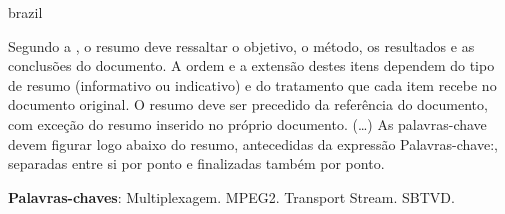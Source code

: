 \documentclass[
	12pt,				%
	openright,			%
	twoside,			%
	a4paper,			%
	brazil,
	french,				%
	english
	]{abntex2}
\begin{document}
%




\setlength{\absparsep}{18pt} %
\begin{resumo}[Resumo]
 \begin{otherlanguage*}{brazil}
 
Segundo a , o resumo deve ressaltar o objetivo, o método, os resultados e as conclusões do documento. A ordem e a extensão destes itens dependem do tipo de resumo (informativo ou indicativo) e do tratamento que cada item recebe no documento original. O resumo deve ser precedido da referência do documento, com exceção do resumo inserido no
 próprio documento. (\ldots) As palavras-chave devem figurar logo abaixo do resumo, antecedidas da expressão Palavras-chave:, separadas entre si por ponto e finalizadas também por ponto.

 \textbf{Palavras-chaves}: Multiplexagem. MPEG2. Transport Stream. SBTVD.
 \end{otherlanguage*}
\end{resumo}
\end{document}
